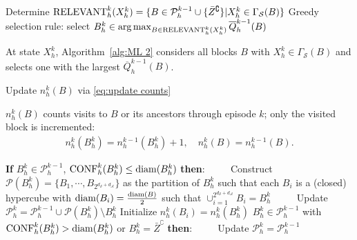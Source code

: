 \documentclass[final,supplement]{siamart251216}
\begin{document}
\begin{algorithm}[H]
    \caption{BLOCK SELECTION$(X_h^k)$}\label{alg:ML 2}
\begin{algorithmic}[1]
    \State \label{projection operator I}
    Determine ${\rm RELEVANT}_h^k(X_h^k) = \{B\in \mathcal{P}_h^{k-1}\cup\{\bar{Z}^{\complement}\}|X_h^k\in \Gamma_{\mathcal{S}}(B)\}$ 
\State \label{Greedy selection rule} 
Greedy selection rule: select $B_h^k \in \arg \max _{B\in {\rm RELEVANT}_h^k(X_h^k)}
\overline{Q}_h^{k-1}(B)$ 
\end{algorithmic}
\end{algorithm}
\vspace{-5pt}
At state $X_h^k$, Algorithm~\ref{alg:ML 2} considers all blocks $B$ with $X_h^k\in\Gamma_{\mathcal S}(B)$ and selects one with the largest $\overline Q_h^{k-1}(B)$.
\vspace{-5pt}
\begin{algorithm}[H]
\caption{UPDATE COUNTS$(B_h^k)$}\label{alg:ML 6}
\begin{algorithmic}[1]
\State \label{counts} 
Update $n_h^k(B)$ via \eqref{eq:update counts}
\EndFor
\end{algorithmic}
\end{algorithm}


 $n_h^k(B)$ counts visits to $B$ or its ancestors through episode $k$; only the visited block is incremented:
\begin{eqnarray}
    n_h^k(B_h^k)=n_h^{k-1}(B_h^k)+1,
  \quad  n_h^k(B)=n_h^{k-1}(B). \label{eq:update counts}
\end{eqnarray}

\begin{algorithm}[H]
\caption{SPLITTING$(B_h^k)$}\label{alg:ML 4}
\begin{algorithmic}[1]
\State\label{splitting rule}  {\bf If} $B_h^k \in \mathcal{P}_h^{k-1}$, ${\rm CONF}_h^k(B_h^k)\leq {\rm {\rm diam}}(B_h^k)$ 
{\bf then}:
\State $\qquad$ Construct $\mathcal{P}(B_h^k)=\{B_1,\cdots,B_{2^{d_{\mathcal{S}}+d_{\mathcal{A}}}}\}$ as the partition of $B_h^k$ such that each $B_i$ is a (closed) hypercube with ${\rm diam}(B_i)=\frac{{\rm diam}(B)}{2}$ such that $\cup_{i=1}^{2^{d_{\mathcal{S}}+d_{\mathcal{A}}}} B_i = B_h^k$
\State $\qquad$ Update $\mathcal{P}_h^k = \mathcal{P}_h^{k-1}\cup \mathcal{P}(B_h^k)\setminus	 B_h^k$
\State Initialize $n_h^k(B_i)=n_h^k(B_h^k)$
\EndFor
{} $B_h^k \in \mathcal{P}_h^{k-1}$ with ${\rm CONF}_h^k(B_h^k)> {\rm {\rm diam}}(B_h^k)$ or $B_h^k=\bar{Z}^{\complement}$
{\bf then}:
\State $\qquad$ Update $\mathcal{P}_h^k = \mathcal{P}_h^{k-1}$
\end{algorithmic}
\end{algorithm}
\end{document}
